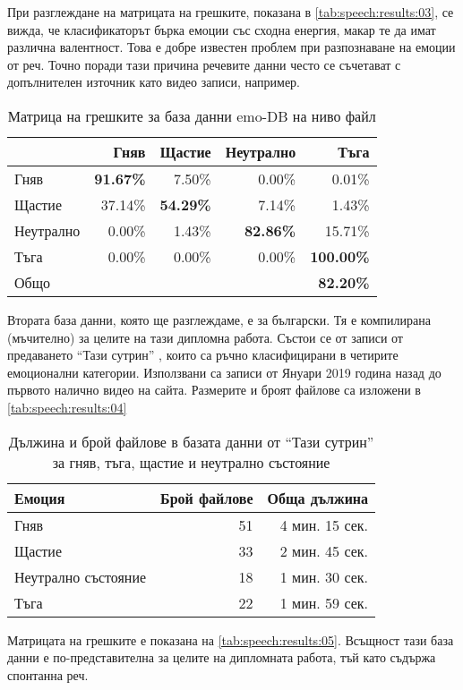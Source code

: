 \documentclass[main.tex]{subfiles}
\begin{document}
При разглеждане на матрицата на грешките, показана в \autoref{tab:speech:results:03}, се вижда, че класификаторът
бърка емоции със сходна енергия, макар те да имат различна валентност. Това е добре известен проблем при разпознаване на емоции от реч. Точно поради тази причина речевите данни често се съчетават с допълнителен източник като видео записи, например. 

\begin{table}[h]
    \begin{center}
    \begin{tabular}{|l|r r r r|} 
        \hline
        & Гняв & Щастие & Неутрално & Тъга \\ 
        \hline
        Гняв &  \textbf{91.67\%} & 7.50\% & 0.00\% & 0.01\% \\ 
        Щастие & 37.14\% & \textbf{54.29\%} & 7.14\% & 1.43\% \\ 
        Неутрално & 0.00\% & 1.43\% & \textbf{82.86\%} & 15.71\% \\ 
        Тъга & 0.00\% & 0.00\% & 0.00\% & \textbf{100.00\%}\\ 
        \hline
        \hline
        Общо & & & & \textbf{82.20\%}\\
        \hline
    \end{tabular}
    \caption{Матрица на грешките за база данни emo-DB на ниво файл}
    \label{tab:speech:results:03}
    \end{center}
\end{table}

Втората база данни, която ще разглеждаме, е за български. Тя е компилирана (мъчително) за целите на тази дипломна работа. Състои се от записи от предаването ``Тази сутрин'' \cite{tazi-sutrin}, които са ръчно класифицирани в четирите емоционални категории. Използвани са записи от Януари 2019 година назад до първото налично видео на сайта. Размерите и броят файлове са изложени в \autoref{tab:speech:results:04}

\begin{table}[ht]
    \begin{center}
    \begin{tabular}{|l|r|r|} 
        \hline
        Емоция & Брой файлове & Обща дължина\\ 
        \hline
        Гняв & 51 & 4 мин. 15 сек.\\ 
        Щастие &  33 & 2 мин. 45 сек.\\ 
        Неутрално състояние &  18 & 1 мин. 30 сек.\\ 
        Тъга &  22 & 1 мин. 59 сек.\\ 
        \hline
    \end{tabular}
    \caption{Дължина и брой файлове в базата данни от ``Тази сутрин'' за гняв, тъга, щастие и неутрално състояние}
    \label{tab:speech:results:04}
    \end{center}
\end{table}
Матрицата на грешките е показана на \autoref{tab:speech:results:05}. Всъщност тази база данни е по-представителна за целите на дипломната работа, тъй като съдържа спонтанна реч.
\end{document}
